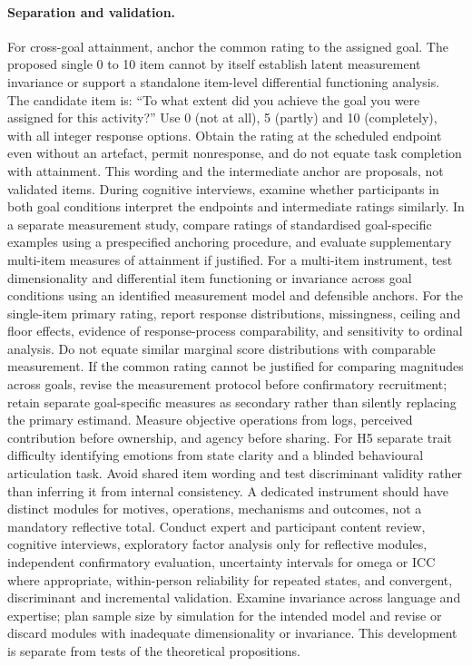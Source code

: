 \paragraph{Separation and validation.} For cross-goal attainment, anchor the common rating to the assigned goal. The proposed single 0 to 10 item cannot by itself establish latent measurement invariance or support a standalone item-level differential functioning analysis. The candidate item is: ``To what extent did you achieve the goal you were assigned for this activity?'' Use 0 (not at all), 5 (partly) and 10 (completely), with all integer response options. Obtain the rating at the scheduled endpoint even without an artefact, permit nonresponse, and do not equate task completion with attainment. This wording and the intermediate anchor are proposals, not validated items. During cognitive interviews, examine whether participants in both goal conditions interpret the endpoints and intermediate ratings similarly. In a separate measurement study, compare ratings of standardised goal-specific examples using a prespecified anchoring procedure, and evaluate supplementary multi-item measures of attainment if justified. For a multi-item instrument, test dimensionality and differential item functioning or invariance across goal conditions using an identified measurement model and defensible anchors. For the single-item primary rating, report response distributions, missingness, ceiling and floor effects, evidence of response-process comparability, and sensitivity to ordinal analysis. Do not equate similar marginal score distributions with comparable measurement. If the common rating cannot be justified for comparing magnitudes across goals, revise the measurement protocol before confirmatory recruitment; retain separate goal-specific measures as secondary rather than silently replacing the primary estimand. Measure objective operations from logs, perceived contribution before ownership, and agency before sharing. For H5 separate trait difficulty identifying emotions from state clarity and a blinded behavioural articulation task. Avoid shared item wording and test discriminant validity rather than inferring it from internal consistency. A dedicated instrument should have distinct modules for motives, operations, mechanisms and outcomes, not a mandatory reflective total. Conduct expert and participant content review, cognitive interviews, exploratory factor analysis only for reflective modules, independent confirmatory evaluation, uncertainty intervals for omega or ICC where appropriate, within-person reliability for repeated states, and convergent, discriminant and incremental validation. Examine invariance across language and expertise; plan sample size by simulation for the intended model and revise or discard modules with inadequate dimensionality or invariance. This development is separate from tests of the theoretical propositions.

